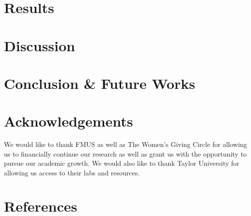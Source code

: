 \documentclass{article}
\begin{document}
%
%
\section{Results}
\justify

%
%
\section{Discussion}
\justify

%
%
\section{Conclusion & Future Works}
\justify

%
%
\section{Acknowledgements}
\justify

We would like to thank FMUS as well as The Women’s Giving Circle for allowing us to financially continue our research as well as grant us with the opportunity to pursue our  academic growth. We would also like to thank Taylor University for allowing us access to their labs and resources. \par

%
%
\section{References}
\justify
\end{document}
